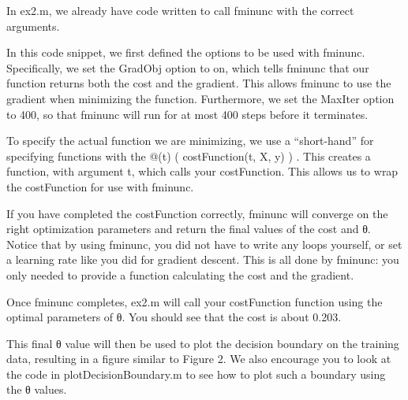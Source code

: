 \documentclass[
]{book}
\begin{document}
In ex2.m, we already have code written to call fminunc with the correct arguments.

In this code snippet, we first defined the options to be used with fminunc. Specifically, we set the GradObj option to on, which tells fminunc that our function returns both the cost and the gradient. This allows fminunc to use the gradient when minimizing the function. Furthermore, we set the MaxIter option to 400, so that fminunc will run for at most 400 steps before it terminates.

To specify the actual function we are minimizing, we use a ``short-hand'' for specifying functions with the @(t) ( costFunction(t, X, y) ) . This creates a function, with argument t, which calls your costFunction. This allows us to wrap the costFunction for use with fminunc.

If you have completed the costFunction correctly, fminunc will converge on the right optimization parameters and return the final values of the cost and θ. Notice that by using fminunc, you did not have to write any loops yourself, or set a learning rate like you did for gradient descent. This is all done by fminunc: you only needed to provide a function calculating the cost and the gradient.

Once fminunc completes, ex2.m will call your costFunction function using the optimal parameters of θ. You should see that the cost is about 0.203.

This final θ value will then be used to plot the decision boundary on the training data, resulting in a figure similar to Figure 2. We also encourage you to look at the code in plotDecisionBoundary.m to see how to plot such a boundary using the θ values.
\end{document}
